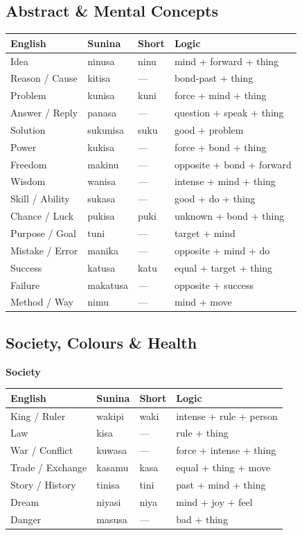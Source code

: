 \documentclass[12pt, a4paper]{article}
\begin{document}
\subsection{Abstract \& Mental Concepts}
\begin{tabular}{@{}llll@{}}
\toprule
\textbf{English} & \textbf{Sunina} & \textbf{Short} & \textbf{Logic} \\ \midrule
Idea & ninusa & ninu & mind + forward + thing \\
Reason / Cause & kitisa & --- & bond-past + thing \\
Problem & kunisa & kuni & force + mind + thing \\
Answer / Reply & panasa & --- & question + speak + thing \\
Solution & sukunisa & suku & good + problem \\
Power & kukisa & --- & force + bond + thing \\
Freedom & makinu & --- & opposite + bond + forward \\
Wisdom & wanisa & --- & intense + mind + thing \\
Skill / Ability & sukasa & --- & good + do + thing \\
Chance / Luck & pukisa & puki & unknown + bond + thing \\
Purpose / Goal & tuni & --- & target + mind \\
Mistake / Error & manika & --- & opposite + mind + do \\
Success & katusa & katu & equal + target + thing \\
Failure & makatusa & --- & opposite + success \\
Method / Way & nimu & --- & mind + move \\
\bottomrule
\end{tabular}

\subsection{Society, Colours \& Health}

\noindent\textbf{Society}
\begin{tabular}{@{}llll@{}}
\toprule
\textbf{English} & \textbf{Sunina} & \textbf{Short} & \textbf{Logic} \\ \midrule
King / Ruler & wakipi & waki & intense + rule + person \\
Law & kisa & --- & rule + thing \\
War / Conflict & kuwasa & --- & force + intense + thing \\
Trade / Exchange & kasamu & kasa & equal + thing + move \\
Story / History & tinisa & tini & past + mind + thing \\
Dream & niyasi & niya & mind + joy + feel \\
Danger & masusa & --- & bad + thing \\
\bottomrule
\end{tabular}
\end{document}
